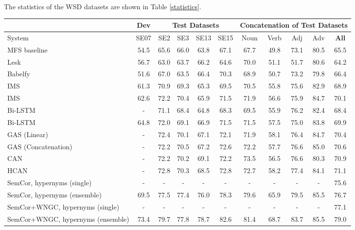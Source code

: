 \documentclass[11pt,a4paper]{article}
\begin{document}
The statistics of the WSD datasets are shown in Table \ref{statistics}.


\begin{table*} [t]
\small
\centering

\resizebox{0.99\linewidth}{!}
{
\begin{tabular}{|l|c|c c c c|c c c c|c|}
    \hline
    & \multicolumn{1}{c|}{Dev} &
    \multicolumn{4}{c|}{Test Datasets} &
    \multicolumn{5}{c|}{Concatenation of Test Datasets} \\
    \hline
    System & SE07 & SE2 & SE3 & SE13 & SE15 & Noun & Verb & Adj & Adv & \bf All \\
    \hline
    MFS baseline & 54.5 & 65.6 & 66.0 & 63.8 & 67.1 & 67.7 & 49.8 & 73.1 & 80.5 & 65.5 \\
    \hline
    Lesk  & 56.7 & 63.0 & 63.7 & 66.2 & 64.6 & 70.0 & 51.1 & 51.7 & 80.6 & 64.2 \\
    Babelfy & 51.6 & 67.0 & 63.5 & 66.4 & 70.3 & 68.9 & 50.7 & 73.2 & 79.8 & 66.4 \\
    \hline
    IMS & 61.3 & 70.9 & 69.3 & 65.3 & 69.5 & 70.5 & 55.8 & 75.6 & 82.9 & 68.9 \\
    IMS & 62.6 & 72.2 & 70.4 & 65.9 & 71.5 & 71.9 & 56.6 & 75.9 & 84.7 & 70.1 \\
    \hline
    Bi-LSTM & - & 71.1 & 68.4 & 64.8 & 68.3 & 69.5 & 55.9 & 76.2 & 82.4 & 68.4 \\
Bi-LSTM  & 64.8 & 72.0 & 69.1 & 66.9 & 71.5 &71.5 & 57.5 & 75.0 & 83.8 & 69.9 \\
GAS (Linear) & - &  72.4 & 70.1 & 67.1 & 72.1 & 71.9 &  58.1 &  76.4 &  84.7 & 70.4\\
    GAS (Concatenation)& - & 72.2 & 70.5 & 67.2 & 72.6 & 72.2 & 57.7 &   76.6 &   85.0 & 70.6\\
CAN  & - & 72.2 & 70.2 & 69.1 & 72.2 & 73.5 & 56.5 & 76.6 & 80.3 & 70.9 \\
    HCAN & - & 72.8 & 70.3 & 68.5 & 72.8 & 72.7 & 58.2 & 77.4 & 84.1 & 71.1 \\
    \hline
    SemCor, hypernyms (single) & - & - & - & - & - & - & - & - & - & 75.6 \\
    SemCor, hypernyms (ensemble) & 69.5 & 77.5 & 77.4 & 76.0 & 78.3 & 79.6 & 65.9 & 79.5 & 85.5 & 76.7 \\ 
    SemCor+WNGC, hypernyms (single) & - & - & - & - & - & - & - & - & - & 77.1 \\
    SemCor+WNGC, hypernyms (ensemble)  & 73.4 & 79.7 & 77.8 & 78.7 & 82.6 & 81.4 & 68.7 & 83.7 & 85.5 & 79.0 \\

\end{tabular}}
\end{table*}
\end{document}
